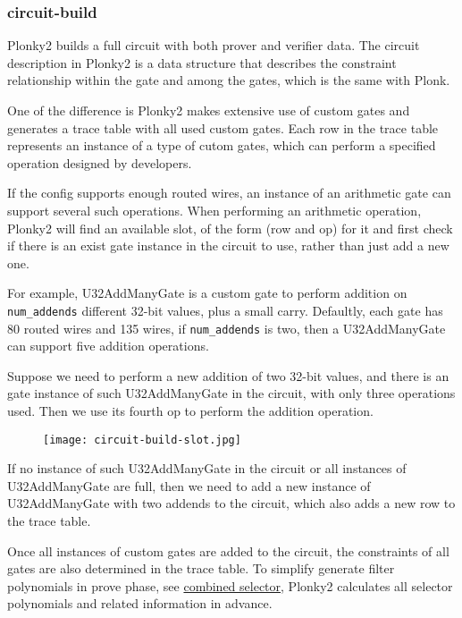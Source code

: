 \subsubsection{circuit-build}

Plonky2 builds a full circuit with both prover and verifier data. The circuit
description in Plonky2 is a data structure that describes the constraint
relationship within the gate and among the gates, which is the same with Plonk.

One of the difference is Plonky2 makes extensive use of custom gates and generates
a trace table with all used custom gates. Each row in the trace table represents
an instance of a type of cutom gates, which can perform a specified operation
designed by developers.

If the config supports enough routed wires, an instance of an arithmetic gate can
support several such operations. When performing an arithmetic operation, Plonky2 
will find an available slot, of the form (row and op) for it and first check if
there is an exist gate instance in the circuit to use, rather than just add a new
one.

For example, U32AddManyGate is a custom gate to perform addition on \verb|num_addends| 
different 32-bit values, plus a small carry. Defaultly, each gate has 80 routed wires
and 135 wires, if \verb|num_addends| is two, then a U32AddManyGate can support five
addition operations.

Suppose we need to perform a new addition of two 32-bit values, and there is an gate
instance of such U32AddManyGate in the circuit, with only three operations used. 
Then we use its fourth op to perform the addition operation.

\begin{figure}[!ht]
    \centering
    \texttt{[image: circuit-build-slot.jpg]}
    \label{fig:circuit-build-slot}
\end{figure}

If no instance of such U32AddManyGate in the circuit or all instances of U32AddManyGate are
full, then we need to add a new instance of U32AddManyGate with two addends to the circuit,
which also adds a new row to the trace table.

Once all instances of custom gates are added to the circuit, the constraints of all gates
are also determined in the trace table. To simplify generate filter polynomials in prove
phase, see \href{https://hackmd.io/@sin7y/H10EO2Z5q#Combined-selector}{combined selector},
Plonky2 calculates all selector polynomials and related information in advance.

